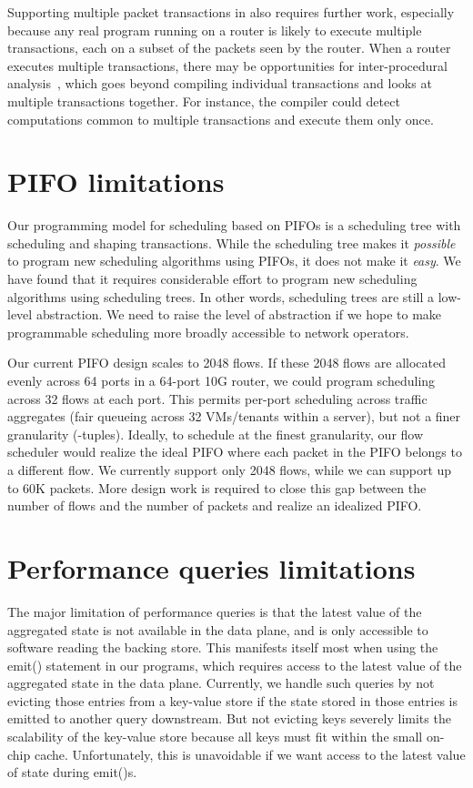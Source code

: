 Supporting multiple packet transactions in \pktlanguage also requires further
work, especially because any real program running on a router is likely to
execute multiple transactions, each on a subset of the packets seen by the
router. When a router executes multiple transactions, there may be
opportunities for inter-procedural analysis~\cite{dragonbook}, which goes
beyond compiling individual transactions and looks at multiple transactions
together.  For instance, the compiler could detect computations common to
multiple transactions and execute them only once.

\section{PIFO limitations}
\label{sec:pifo_limitations}

Our programming model for scheduling based on PIFOs is a scheduling tree with
scheduling and shaping transactions. While the scheduling tree makes it
\textit{possible} to program new scheduling algorithms using PIFOs, it does not
make it \textit{easy}. We have found that it requires considerable effort to
program new scheduling algorithms using scheduling trees.  In other words,
scheduling trees are still a low-level abstraction. We need to raise the level
of abstraction if we hope to make programmable scheduling more broadly
accessible to network operators.

Our current PIFO design scales to 2048 flows. If these 2048 flows are allocated
evenly across 64 ports in a 64-port 10G router, we could program scheduling
across 32 flows at each port. This permits per-port scheduling across traffic
aggregates (\eg fair queueing across 32 VMs/tenants within a server), but not
a finer granularity (-tuples). Ideally, to schedule at the finest
granularity, our flow scheduler would realize the ideal PIFO where each packet
in the PIFO belongs to a different flow. We currently support only 2048 flows,
while we can support up to 60K packets.  More design work is required to close
this gap between the number of flows and the number of packets and realize an
idealized PIFO.

\section{Performance queries limitations}
\label{sec:pq_limitations}

The major limitation of performance queries is that the latest value of the
aggregated state is not available in the data plane, and is only accessible to
software reading the backing store. This manifests itself most when using the
{\ct emit()} statement in our programs, which requires access to the latest
value of the aggregated state in the data plane. Currently, we handle such
queries by not evicting those entries from a key-value store if the state
stored in those entries is emitted to another query downstream. But not
evicting keys severely limits the scalability of the key-value store because
all keys must fit within the small on-chip cache. Unfortunately, this is
unavoidable if we want access to the latest value of state during {\ct
emit()}s.

